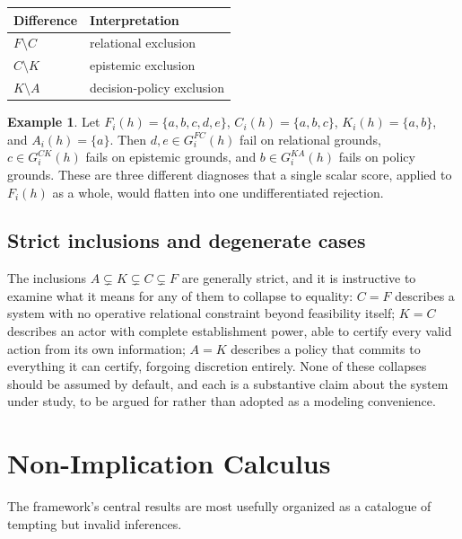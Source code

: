 \documentclass[11pt]{report}
\theoremstyle{definition}
\newtheorem{example}[definition]{Example}
\theoremstyle{plain}
\begin{document}
\begin{center}
\begin{tabular}{@{}ll@{}}
\toprule
Difference & Interpretation \\
\midrule
$F \setminus C$ & relational exclusion \\
$C \setminus K$ & epistemic exclusion \\
$K \setminus A$ & decision-policy exclusion \\
\bottomrule
\end{tabular}
\end{center}

\begin{example}
Let $F_i(h) = \{a,b,c,d,e\}$, $C_i(h) = \{a,b,c\}$, $K_i(h) = \{a,b\}$, and $A_i(h) = \{a\}$. Then $d,e \in G^{FC}_i(h)$ fail on relational grounds, $c \in G^{CK}_i(h)$ fails on epistemic grounds, and $b \in G^{KA}_i(h)$ fails on policy grounds. These are three different diagnoses that a single scalar score, applied to $F_i(h)$ as a whole, would flatten into one undifferentiated rejection.
\end{example}

\section{Strict inclusions and degenerate cases}
The inclusions $A \subsetneq K \subsetneq C \subsetneq F$ are generally strict, and it is instructive to examine what it means for any of them to collapse to equality: $C = F$ describes a system with no operative relational constraint beyond feasibility itself; $K = C$ describes an actor with complete establishment power, able to certify every valid action from its own information; $A = K$ describes a policy that commits to everything it can certify, forgoing discretion entirely. None of these collapses should be assumed by default, and each is a substantive claim about the system under study, to be argued for rather than adopted as a modeling convenience.

\chapter{Non-Implication Calculus}

The framework's central results are most usefully organized as a catalogue of tempting but invalid inferences.
\end{document}
